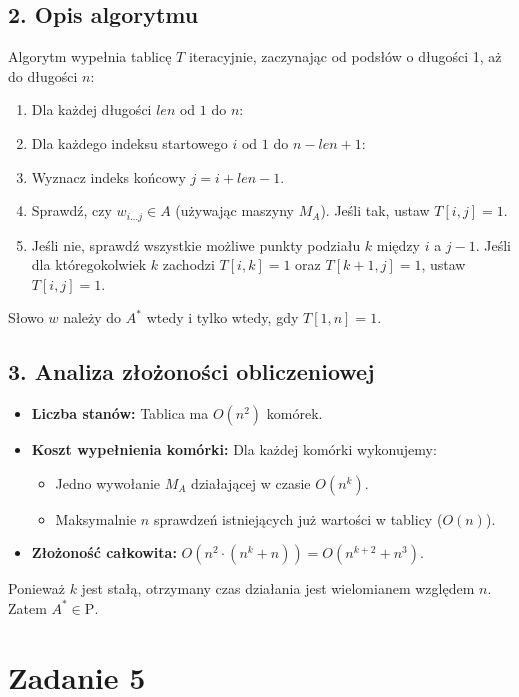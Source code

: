 \documentclass{article}
\begin{document}
\subsection*{2. Opis algorytmu}
Algorytm wypełnia tablicę $T$ iteracyjnie, zaczynając od podsłów o długości 1, aż do długości $n$:
\begin{enumerate}
    \item Dla każdej długości $len$ od $1$ do $n$:
    \item Dla każdego indeksu startowego $i$ od $1$ do $n - len + 1$:
    \item Wyznacz indeks końcowy $j = i + len - 1$.
    \item Sprawdź, czy $w_{i \dots j} \in A$ (używając maszyny $M_A$). Jeśli tak, ustaw $T[i,j] = 1$.
    \item Jeśli nie, sprawdź wszystkie możliwe punkty podziału $k$ między $i$ a $j-1$. Jeśli dla któregokolwiek $k$ zachodzi $T[i,k] = 1$ oraz $T[k+1,j] = 1$, ustaw $T[i,j] = 1$.
\end{enumerate}
Słowo $w$ należy do $A^*$ wtedy i tylko wtedy, gdy $T[1,n] = 1$.

\subsection*{3. Analiza złożoności obliczeniowej}
\begin{itemize}
    \item \textbf{Liczba stanów:} Tablica ma $O(n^2)$ komórek.
    \item \textbf{Koszt wypełnienia komórki:} Dla każdej komórki wykonujemy:
    \begin{itemize}
        \item Jedno wywołanie $M_A$ działającej w czasie $O(n^k)$.
        \item Maksymalnie $n$ sprawdzeń istniejących już wartości w tablicy ($O(n)$).
    \end{itemize}
    \item \textbf{Złożoność całkowita:} $O(n^2 \cdot (n^k + n)) = O(n^{k+2} + n^3)$.
\end{itemize}
Ponieważ $k$ jest stałą, otrzymany czas działania jest wielomianem względem $n$. Zatem $A^* \in \text{P}$.

\section{Zadanie 5}
\end{document}
